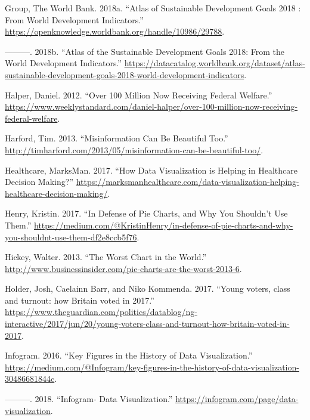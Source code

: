 \documentclass[]{book}
\begin{document}
\leavevmode\hypertarget{ref-worldbankpub}{}%
Group, The World Bank. 2018a. ``Atlas of Sustainable Development Goals 2018 : From World Development Indicators.'' \url{https://openknowledge.worldbank.org/handle/10986/29788}.

\leavevmode\hypertarget{ref-data_access}{}%
---------. 2018b. ``Atlas of the Sustainable Development Goals 2018: From the World Development Indicators.'' \url{https://datacatalog.worldbank.org/dataset/atlas-sustainable-development-goals-2018-world-development-indicators}.

\leavevmode\hypertarget{ref-halper_2012}{}%
Halper, Daniel. 2012. ``Over 100 Million Now Receiving Federal Welfare.'' \url{https://www.weeklystandard.com/daniel-halper/over-100-million-now-receiving-federal-welfare}.

\leavevmode\hypertarget{ref-harford-misinformation}{}%
Harford, Tim. 2013. ``Misinformation Can Be Beautiful Too.'' \url{http://timharford.com/2013/05/misinformation-can-be-beautiful-too/}.

\leavevmode\hypertarget{ref-marksman}{}%
Healthcare, MarksMan. 2017. ``How Data Visualization is Helping in Healthcare Decision Making?'' \url{https://marksmanhealthcare.com/data-visualization-helping-healthcare-decision-making/}.

\leavevmode\hypertarget{ref-henry-defense-pie}{}%
Henry, Kristin. 2017. ``In Defense of Pie Charts, and Why You Shouldn't Use Them.'' \url{https://medium.com/@KristinHenry/in-defense-of-pie-charts-and-why-you-shouldnt-use-them-df2e8ccb5f76}.

\leavevmode\hypertarget{ref-hickey-pie-worst}{}%
Hickey, Walter. 2013. ``The Worst Chart in the World.'' \url{http://www.businessinsider.com/pie-charts-are-the-worst-2013-6}.

\leavevmode\hypertarget{ref-UKvotes2017}{}%
Holder, Josh, Caelainn Barr, and Niko Kommenda. 2017. ``Young voters, class and turnout: how Britain voted in 2017.'' \url{https://www.theguardian.com/politics/datablog/ng-interactive/2017/jun/20/young-voters-class-and-turnout-how-britain-voted-in-2017}.

\leavevmode\hypertarget{ref-history_viz}{}%
Infogram. 2016. ``Key Figures in the History of Data Visualization.'' \href{\%20https://medium.com/@Infogram/key-figures-in-the-history-of-data-visualization-30486681844c}{https://medium.com/@Infogram/key-figures-in-the-history-of-data-visualization-30486681844c}.

\leavevmode\hypertarget{ref-infogram}{}%
---------. 2018. ``Infogram- Data Visualization.'' \href{\%20https://infogram.com/page/data-visualization}{https://infogram.com/page/data-visualization}.
\end{document}

